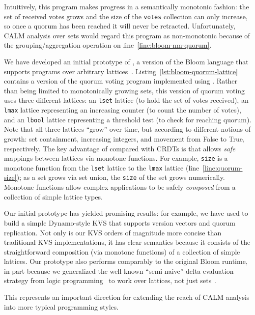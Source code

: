 Intuitively, this program makes progress in a semantically monotonic fashion:
the set of received votes grows and the size of the \texttt{votes} collection
can only increase, so once a quorum has been reached it will never be
retracted. Unfortunately, CALM analysis over sets would regard this program as
non-monotonic because of the grouping/aggregation operation on
line~\ref{line:bloom-nm-quorum}.

We have developed an initial prototype of \blooml, a version of the Bloom
language that supports programs over arbitrary
lattices~\cite{bloom-lattice-tr}. Listing~\ref{lst:bloom-quorum-lattice}
contains a version of the quorum voting program implemented using
\blooml. Rather than being limited to monotonically growing sets, this version
of quorum voting uses three different lattices: an \texttt{lset} lattice (to
hold the set of votes received), an \texttt{lmax} lattice representing an
increasing counter (to count the number of votes), and an \texttt{lbool} lattice
representing a threshold test (to check for reaching quorum). Note that all
three lattices ``grow'' over time, but according to different notions of growth:
set containment, increasing integers, and movement from False to True,
respectively. The key advantage of \blooml compared with CRDTs is that \blooml
allows \emph{safe} mappings between lattices via monotone functions. For
example, \texttt{size} is a monotone function from the \texttt{lset} lattice to
the \texttt{lmax} lattice (line~\ref{line:quorum-size}); as a set grows via set
union, the \texttt{size} of the set grows numerically. Monotone functions allow
complex applications to be safely \emph{composed} from a collection of simple
lattice types.

Our initial \blooml prototype has yielded promising results: for example, we
have used \blooml to build a simple Dynamo-style KVS that supports version
vectors and quorum replication. Not only is our KVS orders of magnitude more
concise than traditional KVS implementations, it has clear semantics because it
consists of the straightforward composition (via monotone functions) of a
collection of simple lattices. Our \blooml prototype also performs comparably to
the original Bloom runtime, in part because we generalized the well-known
``semi-naive'' delta evaluation strategy from logic
programming~\cite{Balbin1987} to work over lattices, not just
sets~\cite{bloom-lattice-tr}.

This represents an important direction for extending the reach of CALM analysis into more typical programming styles.  


